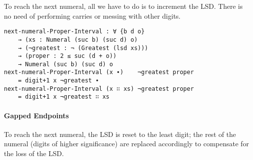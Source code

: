 \documentclass[\main/thesis.tex]{subfiles}
\begin{document}
To reach the next numeral, all we have to do is to increment the LSD.
There is no need of performing carries or messing with other digits.

\begin{lstlisting}[basicstyle=\ttfamily\scriptsize]
next-numeral-Proper-Interval : ∀ {b d o}
    → (xs : Numeral (suc b) (suc d) o)
    → (¬greatest : ¬ (Greatest (lsd xs)))
    → (proper : 2 ≤ suc (d + o))
    → Numeral (suc b) (suc d) o
next-numeral-Proper-Interval (x ∙)    ¬greatest proper
    = digit+1 x ¬greatest ∙
next-numeral-Proper-Interval (x ∷ xs) ¬greatest proper
    = digit+1 x ¬greatest ∷ xs
\end{lstlisting}

\paragraph{Gapped Endpoints}

\begin{center}
    \begin{adjustbox}{max width=\textwidth}
    \end{adjustbox}
\end{center}

To reach the next numeral, the LSD is reset to the least digit;
the rest of the numeral (digits of higher significance) are replaced accordingly
to compensate for the loss of the LSD.
\end{document}
